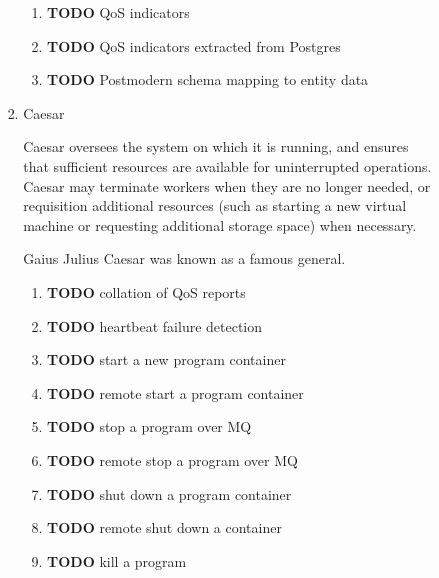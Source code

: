 \documentclass[11pt]{article}
\begin{document}
\begin{enumerate}
\begin{enumerate}
\begin{enumerate}
\begin{enumerate}
\begin{enumerate}
\item {\bfseries\sffamily TODO} QoS indicators
\label{sec-5-4-1-4-3-3-3}

\item {\bfseries\sffamily TODO} QoS indicators extracted from Postgres
\label{sec-5-4-1-4-3-3-4}

\item {\bfseries\sffamily TODO} Postmodern schema mapping to entity data
\label{sec-5-4-1-4-3-3-5}
\end{enumerate}
\item Caesar
\label{sec-5-4-1-4-3-4}

Caesar oversees the system on which it is running, and ensures that
sufficient resources are available for uninterrupted
operations. Caesar may terminate workers when they are no longer
needed, or requisition additional resources (such as starting a new
virtual machine or requesting additional storage space)
when necessary.

Gaius Julius Caesar was known as a famous general.

\begin{enumerate}
\item {\bfseries\sffamily TODO} collation of QoS reports
\label{sec-5-4-1-4-3-4-1}

\item {\bfseries\sffamily TODO} heartbeat failure detection
\label{sec-5-4-1-4-3-4-2}

\item {\bfseries\sffamily TODO} start a new program container
\label{sec-5-4-1-4-3-4-3}

\item {\bfseries\sffamily TODO} remote start a program container
\label{sec-5-4-1-4-3-4-4}

\item {\bfseries\sffamily TODO} stop a program over MQ
\label{sec-5-4-1-4-3-4-5}

\item {\bfseries\sffamily TODO} remote stop a program over MQ
\label{sec-5-4-1-4-3-4-6}

\item {\bfseries\sffamily TODO} shut down a program container
\label{sec-5-4-1-4-3-4-7}

\item {\bfseries\sffamily TODO} remote shut down a container
\label{sec-5-4-1-4-3-4-8}

\item {\bfseries\sffamily TODO} kill a program
\label{sec-5-4-1-4-3-4-9}


\end{enumerate}
\end{enumerate}
\end{enumerate}
\end{enumerate}
\end{enumerate}
\end{document}
